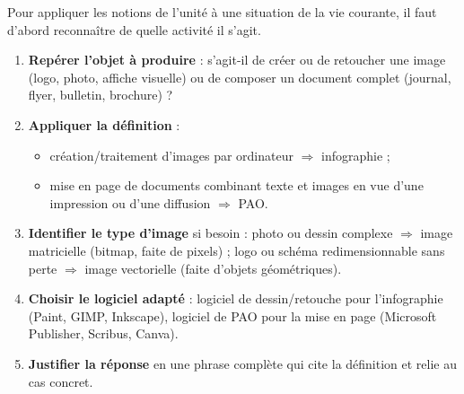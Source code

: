\documentclass[11pt]{article}
\newcommand{\cle}[1]{{\popxbold\color{popdark}#1}}
\begin{document}
\begin{methode}
Pour appliquer les notions de l'unité à une situation de la vie courante, il faut d'abord reconnaître de quelle activité il s'agit.
\begin{enumerate}
\item \textbf{Repérer l'objet à produire} : s'agit-il de créer ou de retoucher une \cle{image} (logo, photo, affiche visuelle) ou de composer un \cle{document complet} (journal, flyer, bulletin, brochure) ?
\item \textbf{Appliquer la définition} :
\begin{itemize}
\item création/traitement d'images par ordinateur $\Rightarrow$ \cle{infographie} ;
\item mise en page de documents combinant texte et images en vue d'une impression ou d'une diffusion $\Rightarrow$ \cle{PAO}.
\end{itemize}
\item \textbf{Identifier le type d'image} si besoin : photo ou dessin complexe $\Rightarrow$ image \cle{matricielle} (bitmap, faite de pixels) ; logo ou schéma redimensionnable sans perte $\Rightarrow$ image \cle{vectorielle} (faite d'objets géométriques).
\item \textbf{Choisir le logiciel adapté} : logiciel de dessin/retouche pour l'infographie (Paint, GIMP, Inkscape), logiciel de PAO pour la mise en page (Microsoft Publisher, Scribus, Canva).
\item \textbf{Justifier la réponse} en une phrase complète qui cite la définition et relie au cas concret.
\end{enumerate}
\end{methode}
\end{document}
